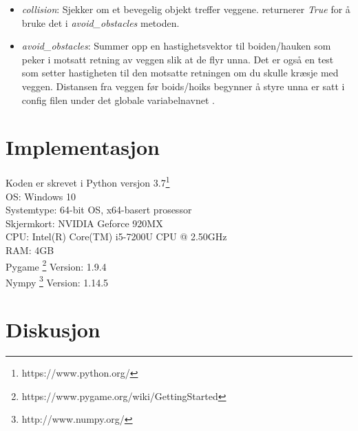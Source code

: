 {\begin{itemize}
    \item \emph{collision}: Sjekker om et bevegelig objekt treffer veggene. returnerer \emph{True} for å bruke det i \emph{avoid\_obstacles} metoden.
    \item \emph{avoid\_obstacles}: Summer opp en hastighetsvektor til boiden/hauken som peker i motsatt retning av veggen slik at de flyr unna. Det er også en test som setter hastigheten til den motsatte retningen om du skulle kræsje med veggen. Distansen fra veggen før boids/hoiks begynner å styre unna er satt i config filen under det globale variabelnavnet \color{purple}{WALL\_DISTANCE\_AVOID\_VALUE}.
\end{itemize}



\section{Implementasjon}
Koden er skrevet i Python versjon 3.7\footnote{https://www.python.org/}\\
OS: Windows 10\\
Systemtype: 64-bit OS, x64-basert prosessor\\
Skjermkort: NVIDIA Geforce 920MX\\
CPU: Intel(R) Core(TM) i5-7200U CPU @ 2.50GHz\\
RAM: 4GB\\
Pygame \footnote{https://www.pygame.org/wiki/GettingStarted} Version: 1.9.4\\
Nympy \footnote{http://www.numpy.org/} Version: 1.14.5\\



\section{Diskusjon}


}
